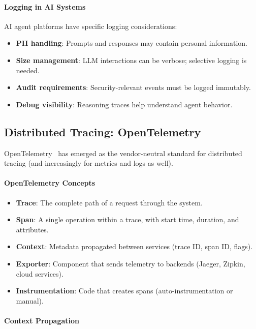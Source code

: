 \paragraph{Logging in AI Systems}

AI agent platforms have specific logging considerations:
\begin{itemize}
    \item \textbf{PII handling}: Prompts and responses may contain personal information.
    \item \textbf{Size management}: LLM interactions can be verbose; selective logging is needed.
    \item \textbf{Audit requirements}: Security-relevant events must be logged immutably.
    \item \textbf{Debug visibility}: Reasoning traces help understand agent behavior.
\end{itemize}

\subsection{Distributed Tracing: OpenTelemetry}

OpenTelemetry~%
has emerged as the vendor-neutral standard for distributed tracing (and increasingly for metrics and logs as well).

\paragraph{OpenTelemetry Concepts}

\begin{itemize}
    \item \textbf{Trace}: The complete path of a request through the system.
    \item \textbf{Span}: A single operation within a trace, with start time, duration, and attributes.
    \item \textbf{Context}: Metadata propagated between services (trace ID, span ID, flags).
    \item \textbf{Exporter}: Component that sends telemetry to backends (Jaeger, Zipkin, cloud services).
    \item \textbf{Instrumentation}: Code that creates spans (auto-instrumentation or manual).
\end{itemize}

\paragraph{Context Propagation}

